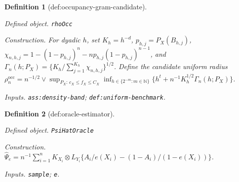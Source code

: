 \documentclass{article}
\newtheorem{definition}{Definition}
\begin{document}
\begin{definition}[def:occupancy-gram-candidate]\label{def:occupancy-gram-candidate}
\par\smallskip\noindent\emph{Defined object.} \texttt{rhoOcc}
\par\smallskip\noindent\emph{Construction.} For dyadic \(h\), set \(K_h=h^{-d}\), \(p_{h,j}=P_X(B_{h,j})\), \(\chi_{n,h,j}=1-(1-p_{h,j})^n-np_{h,j}(1-p_{h,j})^{n-1}\), and \(\Gamma_n(h;P_X)=\{K_h/\sum_{j=1}^{K_h}\chi_{n,h,j}\}^{1/2}\). Define the candidate uniform radius \(\rho_n^{\mathrm{occ}}=n^{-1/2}\vee\sup_{P_X:\,c_X\le f_X\le C_X}\inf_{h\in\{2^{-m}:m\in\mathbb N\}}\{h^t+n^{-1}K_h^{1/2}\Gamma_n(h;P_X)\}\).
\par\smallskip\noindent\emph{Inputs.} \texttt{ass:\allowbreak{}density-\allowbreak{}band}; \texttt{def:\allowbreak{}uniform-\allowbreak{}benchmark}.
\end{definition}

\begin{definition}[def:oracle-estimator]\label{def:oracle-estimator}
\par\smallskip\noindent\emph{Defined object.} \texttt{PsiHatOracle}
\par\smallskip\noindent\emph{Construction.} \(\widehat\Psi_e=n^{-1}\sum_{i=1}^n K_{X_i}\otimes L_{Y_i}\{A_i/e(X_i)-(1-A_i)/(1-e(X_i))\}\).
\par\smallskip\noindent\emph{Inputs.} \texttt{sample}; \texttt{e}.
\end{definition}
\end{document}
